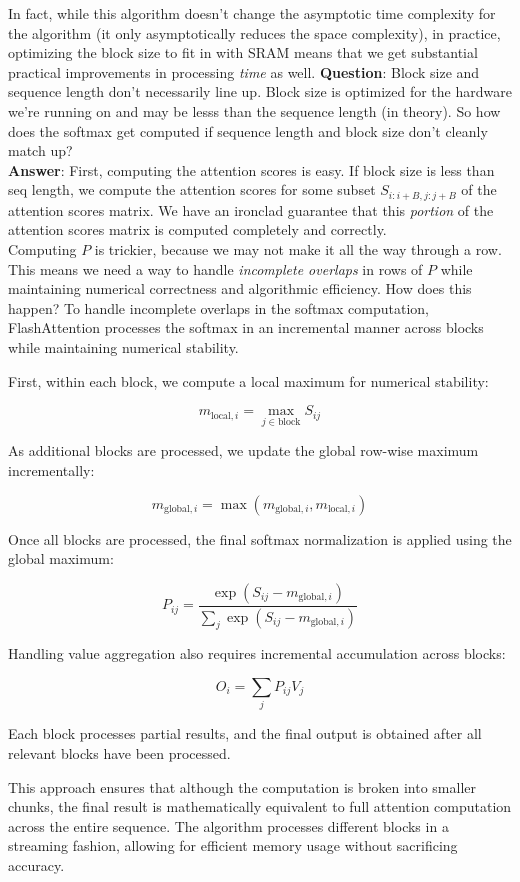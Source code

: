 \documentclass[12pt]{article}
\begin{document}
In fact, while this algorithm doesn't change the asymptotic time complexity for the algorithm (it only asymptotically reduces the space complexity), in practice, optimizing the block size to fit in with SRAM means that we get substantial practical improvements in processing \emph{time} as well. 
\textbf{Question}: Block size and sequence length don't necessarily line up. Block size is optimized for the hardware we're running on and may be lesss than the sequence length (in theory). So how does the softmax get computed if sequence length and block size don't cleanly match up? \\ 
\textbf{Answer}: First, computing the attention scores is easy. If block size is less than seq length, we compute the attention scores for some subset \(S_{i:i+B, j:j+B}\) of the attention scores matrix. We have an ironclad guarantee that this \emph{portion} of the attention scores matrix is computed completely and correctly. \\
Computing \(P\) is trickier, because we may not make it all the way through a row. This means we need a way to handle \emph{incomplete overlaps} in rows of \(P\) while maintaining numerical correctness and algorithmic efficiency. How does this happen?
To handle incomplete overlaps in the softmax computation, FlashAttention processes the softmax in an incremental manner across blocks while maintaining numerical stability.

First, within each block, we compute a local maximum for numerical stability:

\[
m_{\text{local}, i} = \max_{j \in \text{block}} S_{ij}
\]

As additional blocks are processed, we update the global row-wise maximum incrementally:

\[
m_{\text{global}, i} = \max(m_{\text{global}, i}, m_{\text{local}, i})
\]

Once all blocks are processed, the final softmax normalization is applied using the global maximum:

\[
P_{ij} = \frac{\exp(S_{ij} - m_{\text{global}, i})}{\sum_j \exp(S_{ij} - m_{\text{global}, i})}
\]

Handling value aggregation also requires incremental accumulation across blocks:

\[
O_i = \sum_j P_{ij} V_j
\]

Each block processes partial results, and the final output is obtained after all relevant blocks have been processed.

This approach ensures that although the computation is broken into smaller chunks, the final result is mathematically equivalent to full attention computation across the entire sequence. The algorithm processes different blocks in a streaming fashion, allowing for efficient memory usage without sacrificing accuracy.
\end{document}
